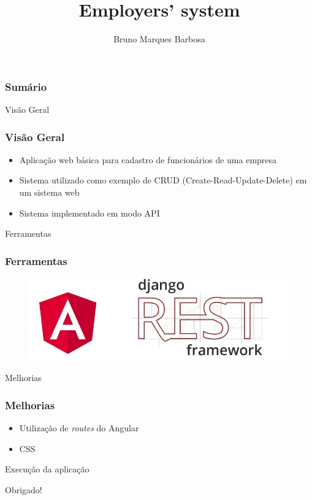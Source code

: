 \documentclass[12pt]{beamer}
\title{Employers' system}
\author{Bruno Marques Barbosa}
\begin{document}
\maketitle

\begin{frame}
\frametitle{Sumário}
\tableofcontents
\end{frame}

\begin{frame}{Visão Geral}
\frametitle{Visão Geral}

\begin{itemize}
\item Aplicação web básica para cadastro de funcionários de uma empresa 
\pause
\item Sistema utilizado como exemplo de CRUD (Create-Read-Update-Delete) em um sistema web
\pause
\item Sistema implementado em modo API
\end{itemize}

\end{frame}
\begin{frame}{Ferramentas}
\frametitle{Ferramentas}

\begin{figure}
\includegraphics[scale=.3]{img/angular-rest}
\end{figure}

\end{frame}

\begin{frame}{Melhorias}
\frametitle{Melhorias}
\begin{itemize}
\item Utilização de \textit{routes} do Angular
\pause
\item CSS
\end{itemize}

\end{frame}

\begin{frame}

\begin{center}
\Huge Execução da aplicação
\end{center}


\end{frame}

\begin{frame}

\begin{center}
\Huge Obrigado!
\end{center}

\end{frame}
\end{document}
